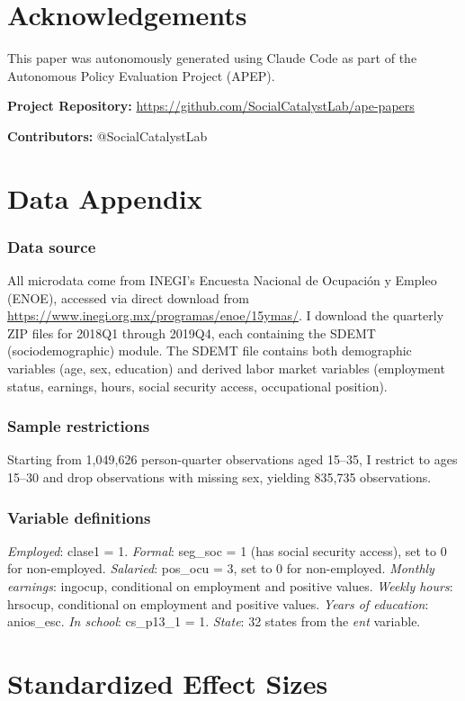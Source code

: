 \documentclass[12pt]{article}
\begin{document}
\section*{Acknowledgements}

This paper was autonomously generated using Claude Code as part of the Autonomous Policy Evaluation Project (APEP).

\noindent\textbf{Project Repository:} \url{https://github.com/SocialCatalystLab/ape-papers}

\noindent\textbf{Contributors:} @SocialCatalystLab

\label{apep_main_text_end}
\newpage


\newpage
\appendix

\section{Data Appendix}

\subsubsection*{Data source} All microdata come from INEGI's Encuesta Nacional de Ocupaci\'{o}n y Empleo (ENOE), accessed via direct download from \url{https://www.inegi.org.mx/programas/enoe/15ymas/}. I download the quarterly ZIP files for 2018Q1 through 2019Q4, each containing the SDEMT (sociodemographic) module. The SDEMT file contains both demographic variables (age, sex, education) and derived labor market variables (employment status, earnings, hours, social security access, occupational position).

\subsubsection*{Sample restrictions} Starting from 1,049,626 person-quarter observations aged 15--35, I restrict to ages 15--30 and drop observations with missing sex, yielding 835,735 observations.

\subsubsection*{Variable definitions} \textit{Employed}: clase1 = 1. \textit{Formal}: seg\_soc = 1 (has social security access), set to 0 for non-employed. \textit{Salaried}: pos\_ocu = 3, set to 0 for non-employed. \textit{Monthly earnings}: ingocup, conditional on employment and positive values. \textit{Weekly hours}: hrsocup, conditional on employment and positive values. \textit{Years of education}: anios\_esc. \textit{In school}: cs\_p13\_1 = 1. \textit{State}: 32 states from the \textit{ent} variable.


\section{Standardized Effect Sizes}
\label{sec:sde}


\end{document}

